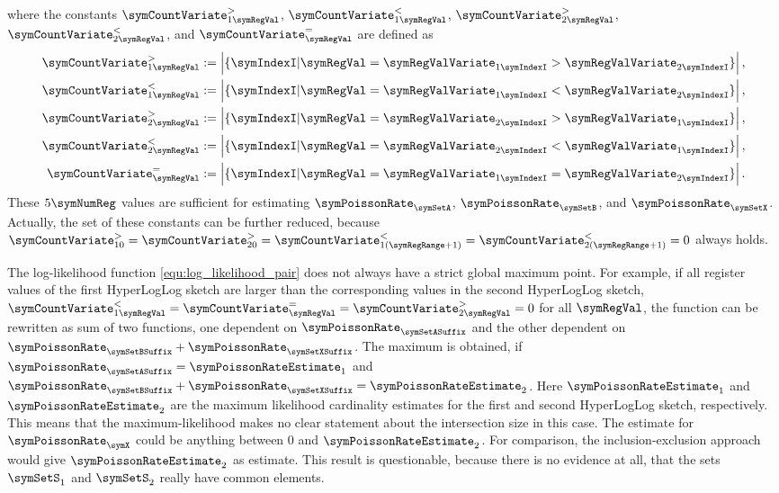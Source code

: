 \documentclass[a4paper]{scrartcl}
\begin{document}
where the constants $\symCountVariate^{>}_{1\symRegVal}$,
$\symCountVariate^{<}_{1\symRegVal}$,
$\symCountVariate^{>}_{2\symRegVal}$,
$\symCountVariate^{<}_{2\symRegVal}$,
and $\symCountVariate^{=}_{\symRegVal}$ are defined as
\begin{equation}
\label{equ:sufficient_joint_statistic}
\begin{aligned}
\symCountVariate^{>}_{1\symRegVal}&:=\left|\lbrace\symIndexI\vert\symRegVal=\symRegValVariate_{1\symIndexI}>
\symRegValVariate_{2\symIndexI}\rbrace\right|,
\\
\symCountVariate^{<}_{1\symRegVal}&:=\left|\lbrace\symIndexI\vert\symRegVal=\symRegValVariate_{1\symIndexI}<
\symRegValVariate_{2\symIndexI}\rbrace\right|,
\\
\symCountVariate^{>}_{2\symRegVal}&:=\left|\lbrace\symIndexI\vert\symRegVal=\symRegValVariate_{2\symIndexI}>
\symRegValVariate_{1\symIndexI}\rbrace\right|,
\\
\symCountVariate^{<}_{2\symRegVal}&:=\left|\lbrace\symIndexI\vert\symRegVal=\symRegValVariate_{2\symIndexI}<
\symRegValVariate_{1\symIndexI}\rbrace\right|,
\\
\symCountVariate^{=}_{\symRegVal}&:=\left|\lbrace\symIndexI\vert\symRegVal=\symRegValVariate_{1\symIndexI}=
\symRegValVariate_{2\symIndexI}\rbrace\right|.
\end{aligned}
\end{equation}
These $5\symNumReg$ values are sufficient for estimating $\symPoissonRate_\symSetA$, $\symPoissonRate_\symSetB$, and $\symPoissonRate_\symSetX$. Actually, the set of these constants can be further reduced, because $\symCountVariate^{>}_{10}=\symCountVariate^{>}_{20}=
\symCountVariate^{<}_{1(\symRegRange+1)}=\symCountVariate^{<}_{2(\symRegRange+1)}=0$
always holds.

The log-likelihood function \eqref{equ:log_likelihood_pair} does not always have a strict global maximum point. For example, if all register values of the first HyperLogLog sketch are larger than the corresponding values in the second HyperLogLog sketch, $\symCountVariate_{1\symRegVal}^{<}
=
\symCountVariate_{\symRegVal}^{=}
=
\symCountVariate_{2\symRegVal}^{>}
=
0$ for all $\symRegVal$, the function can be rewritten as sum of two functions, one dependent on $\symPoissonRate_\symSetASuffix$ and the other dependent on $\symPoissonRate_\symSetBSuffix+\symPoissonRate_\symSetXSuffix$. 
The maximum is obtained, if $\symPoissonRate_\symSetASuffix = \symPoissonRateEstimate_1$ and $\symPoissonRate_\symSetBSuffix+\symPoissonRate_\symSetXSuffix = \symPoissonRateEstimate_2$. Here $\symPoissonRateEstimate_1$ and $\symPoissonRateEstimate_2$ are the maximum likelihood cardinality estimates for the first and second HyperLogLog sketch, respectively. This means that the maximum-likelihood makes no clear statement about the intersection size in this case. The estimate for $\symPoissonRate_\symX$ could be anything between 0 and $\symPoissonRateEstimate_2$. For comparison, the inclusion-exclusion approach would give $\symPoissonRateEstimate_2$ as estimate. This result is questionable, because there is no evidence at all, that the sets $\symSetS_1$ and $\symSetS_2$ really have common elements.
\end{document}
